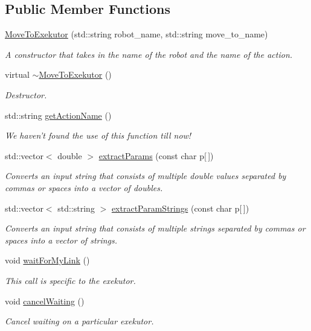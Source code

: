 \subsection*{\-Public \-Member \-Functions}
\begin{DoxyCompactItemize}
\item 
\hyperlink{classexekutor_1_1MoveToExekutor_afe610af0de4a05bc0eb600843acbc616}{\-Move\-To\-Exekutor} (std\-::string robot\-\_\-name, std\-::string move\-\_\-to\-\_\-name)
\begin{DoxyCompactList}\small\item\em \-A constructor that takes in the name of the robot and the name of the action. \end{DoxyCompactList}\item 
virtual \hyperlink{classexekutor_1_1MoveToExekutor_a8b32fe0e820b925e8d457b567783e462}{$\sim$\-Move\-To\-Exekutor} ()
\begin{DoxyCompactList}\small\item\em \-Destructor. \end{DoxyCompactList}\item 
std\-::string \hyperlink{classexekutor_1_1ActionExekutor_a48d170d3931798f4019856fc0f070392}{get\-Action\-Name} ()
\begin{DoxyCompactList}\small\item\em \-We haven't found the use of this function till now! \end{DoxyCompactList}\item 
std\-::vector$<$ double $>$ \hyperlink{classexekutor_1_1ActionExekutor_a4b392ae5a75627136a0c69832628ff28}{extract\-Params} (const char p\mbox{[}$\,$\mbox{]})
\begin{DoxyCompactList}\small\item\em \-Converts an input string that consists of multiple double values separated by commas or spaces into a vector of doubles. \end{DoxyCompactList}\item 
std\-::vector$<$ std\-::string $>$ \hyperlink{classexekutor_1_1ActionExekutor_a0ba18a7fb0cfcd2043fab49e6807aec7}{extract\-Param\-Strings} (const char p\mbox{[}$\,$\mbox{]})
\begin{DoxyCompactList}\small\item\em \-Converts an input string that consists of multiple strings separated by commas or spaces into a vector of strings. \end{DoxyCompactList}\item 
void \hyperlink{classexekutor_1_1ActionExekutor_a842baca8b8c8481088a3024c2304ae92}{wait\-For\-My\-Link} ()
\begin{DoxyCompactList}\small\item\em \-This call is specific to the exekutor. \end{DoxyCompactList}\item 
void \hyperlink{classexekutor_1_1ActionExekutor_a2bf07fe6ee0038ce8d6209310c41a094}{cancel\-Waiting} ()
\begin{DoxyCompactList}\small\item\em \-Cancel waiting on a particular exekutor. \end{DoxyCompactList}\end{DoxyCompactItemize}
